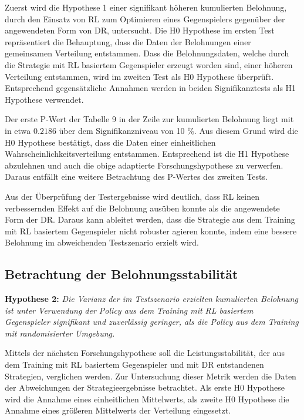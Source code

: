 Zuerst wird die Hypothese 1 einer signifikant höheren kumulierten Belohnung, durch den Einsatz von RL zum Optimieren eines Gegenspielers gegenüber der angewendeten Form von DR, untersucht.
Die H0 Hypothese im ersten Test repräsentiert die Behauptung, dass die Daten der Belohnungen einer gemeinsamen Verteilung entstammen. 
Dass die Belohnungsdaten, welche durch die Strategie mit RL basiertem Gegenspieler erzeugt worden sind, einer höheren Verteilung entstammen, wird im zweiten Test als H0 Hypothese überprüft.
Entsprechend gegensätzliche Annahmen werden in beiden Signifikanztests als H1 Hypothese verwendet.

Der erste P-Wert der Tabelle 9 in der Zeile zur kumulierten Belohnung liegt mit in etwa $0.2186$ über dem Signifikanzniveau von 10 \%.
Aus diesem Grund wird die H0 Hypothese bestätigt, dass die Daten einer einheitlichen Wahrscheinlichkeitsverteilung entstammen.
Entsprechend ist die H1 Hypothese abzulehnen und auch die obige adaptierte Forschungshypothese zu verwerfen.
Daraus entfällt eine weitere Betrachtung des P-Wertes des zweiten Tests.

Aus der Überprüfung der Testergebnisse wird deutlich, dass RL keinen verbessernden Effekt auf die Belohnung ausüben konnte als die angewendete Form der DR.
Daraus kann ableitet werden, dass die Strategie aus dem Training mit RL basiertem Gegenspieler nicht robuster agieren konnte, indem eine bessere Belohnung im abweichenden Testszenario erzielt wird.

\subsection{Betrachtung der Belohnungsstabilität}

\textbf{Hypothese 2:}
\textit{Die Varianz der im Testszenario erzielten kumulierten Belohnung ist unter Verwendung der Policy aus dem Training mit RL basiertem Gegenspieler signifikant und zuverlässig geringer, als die Policy aus dem Training mit randomisierter Umgebung.}

Mittels der nächsten Forschungshypothese soll die Leistungsstabilität, der aus dem Training mit RL basiertem Gegenspieler und mit DR entstandenen Strategien, verglichen werden.
Zur Untersuchung dieser Metrik werden die Daten der Abweichungen der Strategieergebnisse betrachtet.
Als erste H0 Hypothese wird die Annahme eines einheitlichen Mittelwerts, als zweite H0 Hypothese die Annahme eines größeren Mittelwerts der Verteilung eingesetzt.

